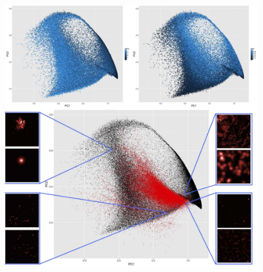 \begin{figure}
\includegraphics[width=\linewidth]{Figures/Final/5-2-2-fig-density-fig5}

\end{figure}
